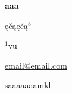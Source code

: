\documentclass[12pt, twoside, a4paper, hidelinks]{article}
\begin{document}
\begin{center} \fontsize{14}{15}\selectfont \textbf{ aaa } \end{center}
\vspace{-0.8cm}

\begin{center} \fontsize{12}{13}\selectfont \underline{ęčąęčą}$^{8}$ \end{center}
\vspace{-.5cm}

\begin{center} \fontsize{10}{11}\selectfont $^{1}$vu
    
    \underline{email@email.com} \end{center}

\fontsize{10}{11}\selectfont
saaaaaaamkl
\end{document}
